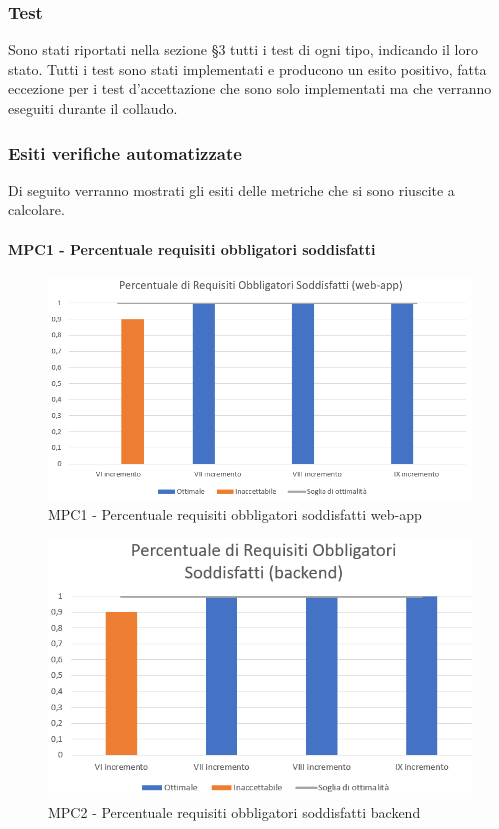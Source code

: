 \subsubsection{Test}
Sono stati riportati nella sezione §3 tutti i test di ogni tipo, indicando il loro stato. Tutti i test sono stati implementati e producono un esito positivo, fatta eccezione per i test d'accettazione che sono solo implementati ma che verranno eseguiti durante il collaudo.
\subsubsection{Esiti verifiche automatizzate}
Di seguito verranno mostrati gli esiti delle metriche che si sono riuscite a calcolare.

\paragraph{MPC1 - Percentuale requisiti obbligatori soddisfatti}
\begin{figure}[h!]
    \centering
      \includegraphics[scale=0.9]{Immagini/PercReqObbWAA.PNG}
    \caption{MPC1 - Percentuale requisiti obbligatori soddisfatti web-app}
  \end{figure}

\begin{figure}[h!]
    \centering
      \includegraphics[scale=1]{Immagini/PercReqObbBEA.PNG}
    \caption{MPC2 - Percentuale requisiti obbligatori soddisfatti backend}
  \end{figure}


